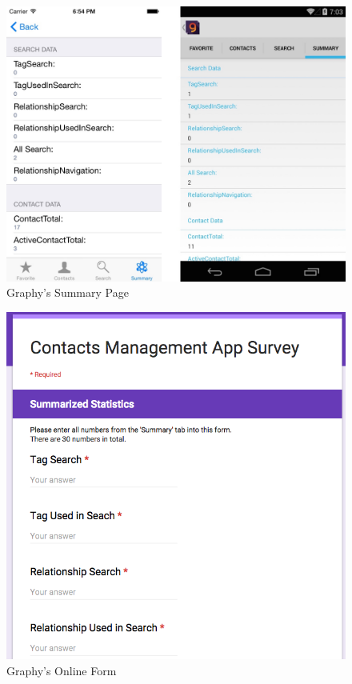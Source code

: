 \begin{figure}[!h]
\begin{centering}
\includegraphics[scale=0.33]{pics/summary_page.png}
\caption{Graphy's Summary Page}\label{fig:summary_page}
\end{centering}
\end{figure}

\begin{figure}[!h]
\begin{centering}
\includegraphics[scale=0.6]{pics/survey_form.png}
\caption{Graphy's Online Form}\label{fig:survey_form}
\end{centering}
\end{figure}

